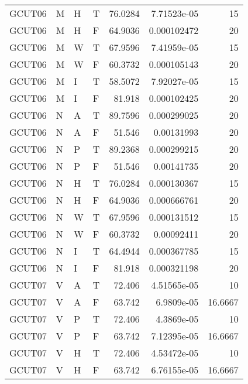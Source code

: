 \begin{longtable}{llllrrr}
    GCUT06   & M     & H     & T          & 76.0284    & 7.71523e-05 & 15       \\
    GCUT06   & M     & H     & F          & 64.9036    & 0.000102472 & 20       \\
    GCUT06   & M     & W     & T          & 67.9596    & 7.41959e-05 & 15       \\
    GCUT06   & M     & W     & F          & 60.3732    & 0.000105143 & 20       \\
    GCUT06   & M     & I     & T          & 58.5072    & 7.92027e-05 & 15       \\
    GCUT06   & M     & I     & F          & 81.918     & 0.000102425 & 20       \\
    GCUT06   & N     & A     & T          & 89.7596    & 0.000299025 & 20       \\
    GCUT06   & N     & A     & F          & 51.546     & 0.00131993  & 20       \\
    GCUT06   & N     & P     & T          & 89.2368    & 0.000299215 & 20       \\
    GCUT06   & N     & P     & F          & 51.546     & 0.00141735  & 20       \\
    GCUT06   & N     & H     & T          & 76.0284    & 0.000130367 & 15       \\
    GCUT06   & N     & H     & F          & 64.9036    & 0.000666761 & 20       \\
    GCUT06   & N     & W     & T          & 67.9596    & 0.000131512 & 15       \\
    GCUT06   & N     & W     & F          & 60.3732    & 0.00092411  & 20       \\
    GCUT06   & N     & I     & T          & 64.4944    & 0.000367785 & 15       \\
    GCUT06   & N     & I     & F          & 81.918     & 0.000321198 & 20       \\
    GCUT07   & V     & A     & T          & 72.406     & 4.51565e-05 & 10       \\
    GCUT07   & V     & A     & F          & 63.742     & 6.9809e-05  & 16.6667  \\
    GCUT07   & V     & P     & T          & 72.406     & 4.3869e-05  & 10       \\
    GCUT07   & V     & P     & F          & 63.742     & 7.12395e-05 & 16.6667  \\
    GCUT07   & V     & H     & T          & 72.406     & 4.53472e-05 & 10       \\
    GCUT07   & V     & H     & F          & 63.742     & 6.76155e-05 & 16.6667  \\

\end{longtable}
